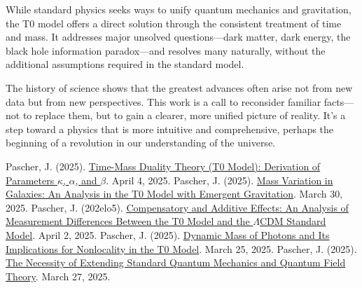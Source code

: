 \documentclass[a4paper,12pt]{article}
\begin{document}
	While standard physics seeks ways to unify quantum mechanics and gravitation, the T0 model offers a direct solution through the consistent treatment of time and mass. It addresses major unsolved questions—dark matter, dark energy, the black hole information paradox—and resolves many naturally, without the additional assumptions required in the standard model.
	
	The history of science shows that the greatest advances often arise not from new data but from new perspectives. This work is a call to reconsider familiar facts—not to replace them, but to gain a clearer, more unified picture of reality. It’s a step toward a physics that is more intuitive and comprehensive, perhaps the beginning of a revolution in our understanding of the universe.
	
	\begin{thebibliography}{99}
		 Pascher, J. (2025). \href{https://github.com/jpascher/T0-Time-Mass-Duality/tree/main/2/pdf/English/ZeitMasseT0ParamsEn.pdf}{Time-Mass Duality Theory (T0 Model): Derivation of Parameters \(\kappa\), \(\alpha\), and \(\beta\)}. April 4, 2025.
		 Pascher, J. (2025). \href{https://github.com/jpascher/T0-Time-Mass-Duality/tree/main/2/pdf/English/MassVarGalaxienEn.pdf}{Mass Variation in Galaxies: An Analysis in the T0 Model with Emergent Gravitation}. March 30, 2025.
		 Pascher, J. (202elo5). \href{https://github.com/jpascher/T0-Time-Mass-Duality/tree/main/2/pdf/English/MessdifferenzenT0StandardEn.pdf}{Compensatory and Additive Effects: An Analysis of Measurement Differences Between the T0 Model and the \(\Lambda\)CDM Standard Model}. April 2, 2025.
		 Pascher, J. (2025). \href{https://github.com/jpascher/T0-Time-Mass-Duality/tree/main/2/pdf/English/DynMassePhotonenNichtlokalEn.pdf}{Dynamic Mass of Photons and Its Implications for Nonlocality in the T0 Model}. March 25, 2025.
		 Pascher, J. (2025). \href{https://github.com/jpascher/T0-Time-Mass-Duality/tree/main/2/pdf/English/NotwendigkeitQMErweiterungEn.pdf}{The Necessity of Extending Standard Quantum Mechanics and Quantum Field Theory}. March 27, 2025.
	\end{thebibliography}
	
\end{document}

